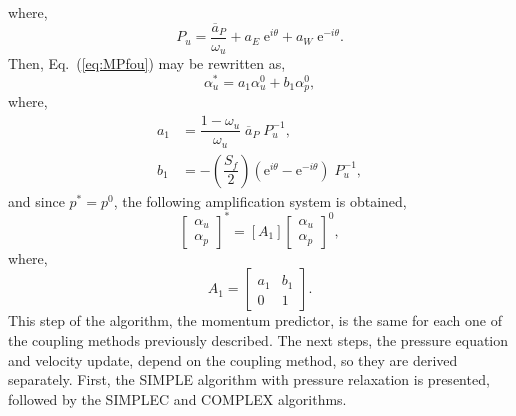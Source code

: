 \documentclass[final,3p,times,11pt,onecolumn]{myElsarticle}
\numberwithin{equation}{section}
\begin{document}
where,
\begin{equation}
P_u = \dfrac{\overline{a}_P}{\omega_u}  + a_E \; \text{e}^{i \theta} + a_W \; \text{e}^{-i \theta}.
\end{equation}
Then, Eq.~(\ref{eq:MPfou}) may be rewritten as,
\begin{equation}
     \alpha_u^* = a_1 \alpha_u^0 + b_1 \alpha_p^0,
    \label{eq:MPfou2}
\end{equation}
where,
\begin{equation}
\begin{split}
     a_1 &= \dfrac{1-\omega_u}{\omega_u} \; \overline{a}_P \; P_u^{-1},
\\
b_1 &= - \left( \dfrac{S_f}{2} \right) \left( \text{e}^{i \theta} -  \text{e}^{-i \theta} \right) \; P_u^{-1},
\end{split}
\end{equation}
and since $p^* = p^0$, the following amplification system is obtained,
\begin{equation}
\begin{bmatrix}
\alpha_u \\
\alpha_p 
\end{bmatrix}^{*} =
[A_1]
\begin{bmatrix}
\alpha_u \\
\alpha_p 
\end{bmatrix}^{0},
\end{equation}
where,
\begin{equation}
A_1 
=
\begin{bmatrix}
a_1 & b_1 \\
0 & 1
\end{bmatrix}. 
\end{equation}
This step of the algorithm, the momentum predictor, is the same for each one of the coupling methods previously described. The next steps, the pressure equation and velocity update, depend on the coupling method, so they are derived separately. First, the SIMPLE algorithm with pressure relaxation is presented, followed by the SIMPLEC and COMPLEX algorithms.
\end{document}
